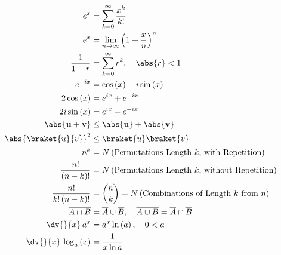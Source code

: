 \begin{subequations}\label{eq:additional:misc:math}
\begin{align}
e^{x} &= \sum_{k=0}^{\infty} \frac{x^{k}}{k!} \label{eq:additional:misc:math:ex} \\
e^{x} &= \lim_{n \to \infty} \left(1 + \frac{x}{n}\right)^{n} \label{eq:additional:misc:math:ex_limit} \\
\frac{1}{1-r} &= \sum_{k=0}^{\infty} r^{k}, \quad \abs{r} < 1 \label{eq:additional:misc:math:geometric} \\
e^{-i x} &= \cos\left(x\right) + i \sin\left(x\right) \label{eq:additional:misc:math:eulers_formula} \\
2 \cos\left(x\right) &= e^{i x} + e^{-i x} \label{eq:additional:misc:math:cos_exp} \\
2i \sin\left(x\right) &= e^{i x} - e^{-i x} \label{eq:additional:misc:math:sin_exp} \\
\abs{\mathbf{u} + \mathbf{v}} &\leq \abs{\mathbf{u}} + \abs{\mathbf{v}} \label{eq:additional:misc:math:triangle_inequality} \\
\abs{\braket{u}{v}}^{2} &\leq \braket{u} \braket{v} \label{eq:additional:misc:math:cauchy_schwarz_inequality} \\
n^{k} &= N\left(\text{Permutations Length $k$, with Repetition}\right) \label{eq:additional:misc:math:permutations_with_repetition} \\
\frac{n!}{\left(n-k\right)!} &= N\left(\text{Permutations Length $k$, without Repetition}\right) \label{eq:additional:misc:math:permutations_without_repetition} \\
\frac{n!}{k!\left(n-k\right)!} &= {n \choose k} = N\left(\text{Combinations of Length $k$ from $n$}\right) \label{eq:additional:misc:math:binomial_coefficient} \\
\overline{A \cap B} &= \overline{A} \cup \overline{B},\quad \overline{A \cup B} = \overline{A} \cap \overline{B} \label{eq:additional:misc:math:de_morgan} \\
\dv{}{x}\, a^{x} &= a^{x} \ln\left(a\right), \quad 0 < a \label{eq:additional:misc:math:diff_exp_gen} \\
\dv{}{x}\, \log_{a}\left(x\right) &= \frac{1}{x \ln a} \label{eq:additional:misc:math:diff_log_gen}
\end{align}
\end{subequations}
